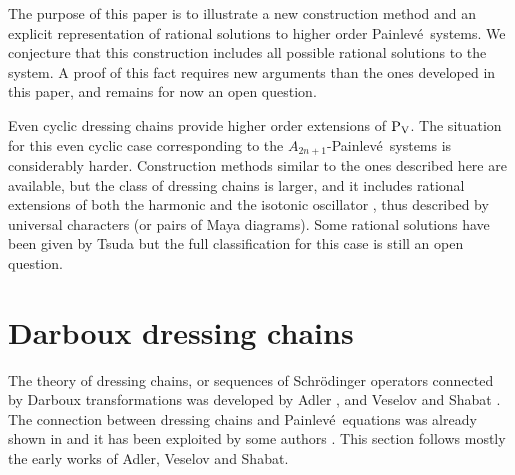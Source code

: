 \documentclass[10pt]{amsart}
\theoremstyle{definition}
\numberwithin{equation}{section}
\numberwithin{figure}{section}
\newcommand{\Pfive}{{\rm P_{V}}}
\newcommand{\p}{Painlev\'{e}}
\begin{document}
The purpose of this paper is to illustrate a new construction method and an explicit representation of rational solutions to higher order \p\ systems. We conjecture that this construction includes all possible rational solutions to the system. A proof of this fact requires new arguments than the ones developed in this paper, and remains for now an open question.


Even cyclic dressing chains provide higher order extensions of $\Pfive$. The situation for this even cyclic case corresponding to the $A_{2n+1}$-\p\ systems is considerably harder. Construction methods similar to the ones described here are available, but the class of dressing chains is larger, and it includes rational extensions of both the harmonic and the isotonic oscillator \cite{grandati2011solvable,grandati2012multistep}, thus described by universal characters (or pairs of Maya diagrams). Some rational solutions have been given by Tsuda \cite{tsuda2005universal} but the full classification for this case is still an open question. 





\section{Darboux dressing chains}\label{sec:dressing}


The theory of dressing chains, or sequences of Schr\"{o}dinger operators
connected by Darboux transformations was developed by Adler
\cite{adler1994nonlinear}, and Veselov and Shabat
\cite{veselov1993dressing}. The connection between dressing chains and
\p\ equations was already shown in \cite{adler1994nonlinear}
and it has been exploited by some authors %
\cite{takasaki2003spectral,tsuda2005universal,bermudez2012complexb,marquette2013one,marquette2013two,marquette2016,
sen2005darboux,WilloxHietarinta,MateoNegro}. 
This section follows mostly the early works of Adler, Veselov and Shabat.
\end{document}
